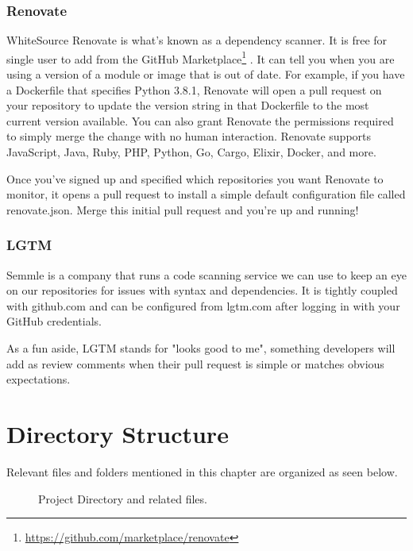 \subsubsection{Renovate}

WhiteSource Renovate is what's known as a dependency scanner. It is free
for single user to add from the GitHub Marketplace\footnote{\url{https://github.com/marketplace/renovate}}
. It can tell you when you are using a version of a module or image that
is out of date. For example, if you have a Dockerfile that specifies
Python 3.8.1, Renovate will open a pull request on your repository to
update the version string in that Dockerfile to the most current version
available. You can also grant Renovate the permissions required to
simply merge the change with no human interaction. Renovate supports
JavaScript, Java, Ruby, PHP, Python, Go, Cargo, Elixir, Docker, and
more.

\justify
Once you've signed up and specified which repositories you want Renovate
to monitor, it opens a pull request to install a simple default
configuration file called renovate.json. Merge this initial pull request
and you're up and running!

\subsubsection{LGTM}

Semmle is a company that runs a code scanning service we can use to keep
an eye on our repositories for issues with syntax and dependencies. It
is tightly coupled with github.com and can be configured from lgtm.com
after logging in with your GitHub credentials.

\justify
As a fun aside, LGTM stands for "looks good to me", something developers
will add as review comments when their pull request is simple or matches
obvious expectations.

\clearpage


\section{Directory Structure}

Relevant files and folders mentioned in this chapter are organized as
seen below.

\begin{figure}
	\centering
	\caption{Project Directory and related files.}
\end{figure}
